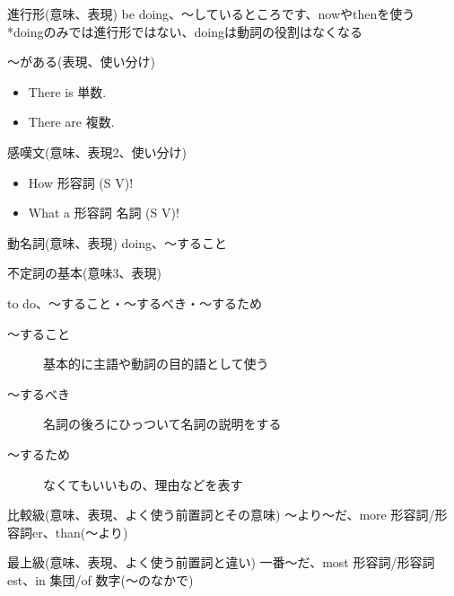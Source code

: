 \documentclass[10pt]{jsarticle}
\newcommand{\answer}[2]{{\color{orange}#2}}
\newcommand{\answer}[2]{\vspace{#1mm}}
\begin{document}
\newpage

\begin{itembox}[l]{進行形(意味、表現)}
	\answer{10}{be doing、〜しているところです、nowやthenを使う\\
		*doingのみでは進行形ではない、doingは動詞の役割はなくなる}
\end{itembox}

\begin{itembox}[l]{〜がある(表現、使い分け)}
	\answer{10}{
		\begin{itemize}
			\item There is 単数.
			\item There are 複数.
		\end{itemize}
	}
\end{itembox}
\begin{itembox}[l]{感嘆文(意味、表現2、使い分け)}
	\answer{10}{
		\begin{itemize}
			\item How 形容詞 (S V)!
			\item What a 形容詞 名詞 (S V)!
		\end{itemize}
	}
\end{itembox}

\begin{itembox}[l]{動名詞(意味、表現)}
	\answer{10}{doing、〜すること}
\end{itembox}

\begin{itembox}[l]{不定詞の基本(意味3、表現)}
	\answer{10}{to do、〜すること・〜するべき・〜するため
		\begin{description}
			\item[〜すること] 基本的に主語や動詞の目的語として使う
			\item[〜するべき] 名詞の後ろにひっついて名詞の説明をする
			\item[〜するため] なくてもいいもの、理由などを表す
		\end{description}
	}
\end{itembox}

\begin{itembox}[l]{比較級(意味、表現、よく使う前置詞とその意味)}
	\answer{10}{〜より〜だ、more 形容詞/形容詞er、than(〜より)}
\end{itembox}

\begin{itembox}[l]{最上級(意味、表現、よく使う前置詞と違い)}
	\answer{10}{一番〜だ、most 形容詞/形容詞est、in 集団/of 数字(〜のなかで)}
\end{itembox}
\end{document}
